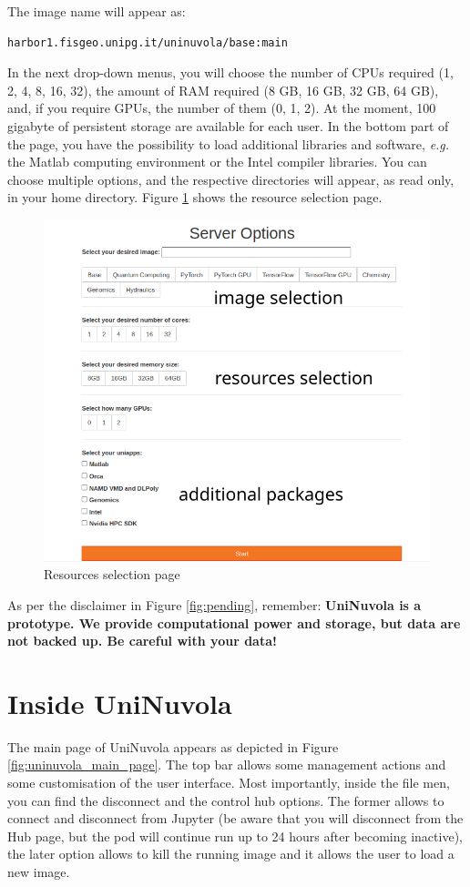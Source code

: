 The image name will appear as:
\begin{lstlisting}[language=bash] 
harbor1.fisgeo.unipg.it/uninuvola/base:main
\end{lstlisting}

In the next drop-down menus, you will choose the number of CPUs required (1, 2, 4, 8, 16, 32), the amount of RAM
required (8 GB, 16 GB, 32 GB, 64 GB), and, if you require GPUs, the number of them (0, 1, 2). At the moment, 100
gigabyte of persistent storage are available for each user. In the bottom part of the page, you have the possibility to load additional libraries and software, \textit{e.g.} the Matlab computing environment or the Intel compiler libraries. You can choose multiple options, and the respective directories will appear, as read only, in your home directory. Figure \ref{fig:resources} shows the resource selection page.\\

\begin{figure}[!ht]
    \centering
    \includegraphics[width=0.75\linewidth]{img/resource_selection.png}
    \caption{Resources selection page}
    \label{fig:resources}
\end{figure}

As per the disclaimer in Figure \ref{fig:pending}, remember: \textbf{UniNuvola is a prototype. We provide computational
    power and storage, but data are not backed up. Be careful with your data!} \\

\section{Inside UniNuvola}
The main page of UniNuvola appears as depicted in Figure \ref{fig:uninuvola_main_page}. The top bar allows some
management actions and some customisation of the user interface. Most importantly, inside the file men, you can find the
disconnect and  the control hub options. The former allows to connect and disconnect from Jupyter (be aware that you
will disconnect from the Hub page, but the pod will continue run up to 24 hours after becoming inactive), the later
option allows to kill the running image and it allows the user to load a new image. \\

